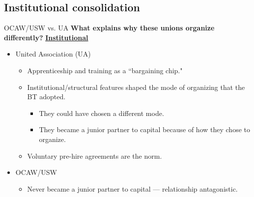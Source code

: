 \documentclass{beamer}
\begin{document}
\subsection*{Institutional consolidation}
\begin{frame}{OCAW/USW vs. UA}
\textbf{What explains why these unions organize differently?}\newline\newline
\underline{\textbf{Institutional}}
	\begin{itemize}
		\item United Association (UA)
			\begin{itemize}
				\item Apprenticeship and training as a ``bargaining chip."
				\item Institutional/structural features shaped the mode of organizing that the BT adopted.
				\begin{itemize}
					\item They could have chosen a different mode.
					\item They became a junior partner to capital because of how they chose to organize.
				\end{itemize}
			\item Voluntary pre-hire agreements are the norm.
	\end{itemize}
		\item OCAW/USW
		\begin{itemize}
			\item Never became a junior partner to capital — relationship antagonistic.
		\end{itemize}
	\end{itemize}
\end{frame}
\end{document}

